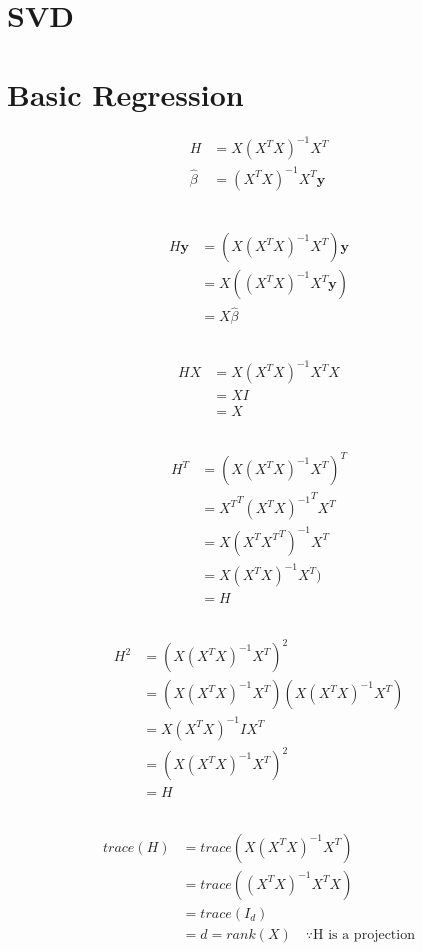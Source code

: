 \documentclass[12pt,a4paper]{article}
\begin{document}
\section{SVD}

\section{Basic Regression}
\begin{align}
H &= X(X^T X)^{-1}X^T\\
\hat{\beta} &= (X^T X)^{-1}X^T\mathbf{y}\\
\end{align}

\subsection{}
\begin{align*}
H\textbf{y}&= (X(X^T X)^{-1}X^T)\textbf{y}\\
&=X((X^T X)^{-1}X^T\textbf{y})\\
 &= X\hat{\beta}
\end{align*}

\subsection{}
\begin{align*}
HX&= X(X^T X)^{-1}X^TX\\
&= XI\\
&=X
\end{align*}

\subsection{}
\begin{align*}
H^T&= (X(X^T X)^{-1}X^T)^T\\
&= {X^T}^T{(X^T X)^{-1}}^TX^T\\
&= X(X^T {X^T}^T)^{-1}X^T\\
&= X(X^T X)^{-1}X^T)\\
&= H
\end{align*}

\subsection{}
\begin{align*}
H^2&= (X(X^T X)^{-1}X^T)^2\\
&= (X(X^T X)^{-1}X^T)(X(X^T X)^{-1}X^T) \\
&= X(X^T X)^{-1}IX^T \\
&= (X(X^T X)^{-1}X^T)^2\\
&= H
\end{align*}
\subsection{}

\subsection{}
\begin{align*}
trace(H) &= trace(X(X^T X)^{-1}X^T)\\
&= trace((X^T X)^{-1}X^TX)\\
&= trace(I_d) \\
&= d = rank(X)\quad \because \text{H is a projection}
\end{align*}
\end{document}
